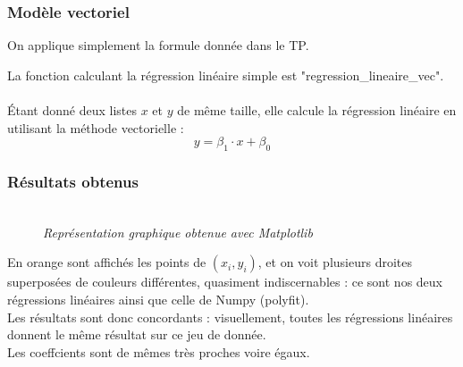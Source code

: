 \documentclass{article}      %
\begin{document}
\subsubsection{Modèle vectoriel}
On applique simplement la formule donnée dans le TP.

La fonction calculant la régression linéaire simple est "regression\_lineaire\_vec".
\\%
\\Étant donné deux listes $x$ et $y$ de même taille, elle calcule la régression linéaire en utilisant la méthode vectorielle : $$y = \beta_1 \cdot x + \beta_0$$
%


\subsubsection{Résultats obtenus}
\begin{figure}[H]
    \centering
    \\
    \textit{Représentation graphique obtenue avec Matplotlib}
\end{figure}
%
En orange sont affichés les points de $(x_i, y_i)$, et on voit plusieurs droites superposées de couleurs différentes, quasiment indiscernables : ce sont nos deux régressions linéaires ainsi que celle de Numpy (polyfit).
\\Les résultats sont donc concordants : visuellement, toutes les régressions linéaires donnent le même résultat sur ce jeu de donnée.
%
\\Les coeffcients sont de mêmes très proches voire égaux.
\end{document}
